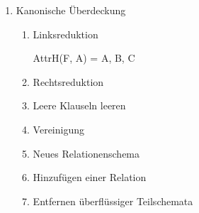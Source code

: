 \documentclass{lehramt-informatik-haupt}
\begin{document}
\begin{enumerate}
\item Kanonische Überdeckung

\begin{enumerate}
\item Linksreduktion

AttrH(F, A) = {A, B, C}


\item Rechtsreduktion


\item Leere Klauseln leeren


\item Vereinigung

\item Neues Relationenschema


\item Hinzufügen einer Relation
\item Entfernen überflüssiger Teilschemata

\end{enumerate}
\end{enumerate}

%
\end{document}
